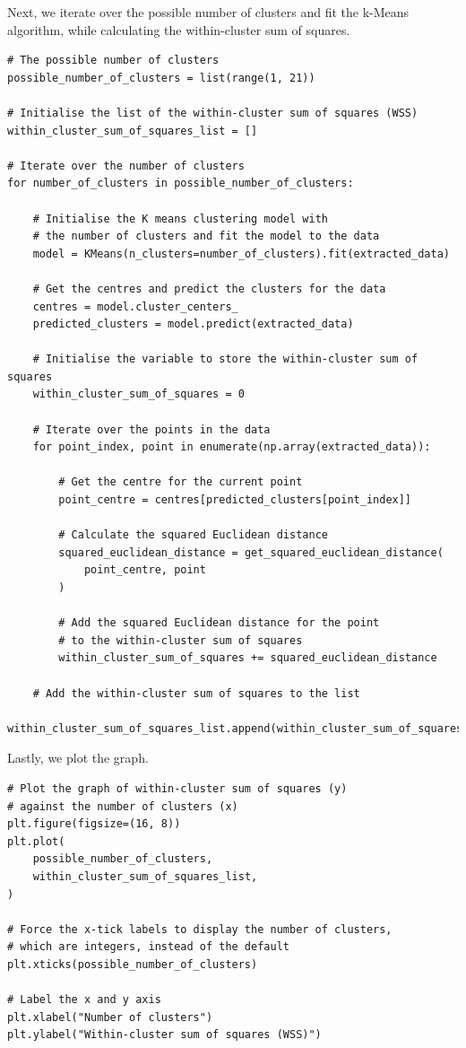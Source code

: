 \documentclass[11pt]{article}
\begin{document}
Next, we iterate over the possible number of clusters and fit the k-Means algorithm, while calculating the within-cluster sum of squares.
\begin{verbatim}
# The possible number of clusters
possible_number_of_clusters = list(range(1, 21))

# Initialise the list of the within-cluster sum of squares (WSS)
within_cluster_sum_of_squares_list = []

# Iterate over the number of clusters
for number_of_clusters in possible_number_of_clusters:

    # Initialise the K means clustering model with
    # the number of clusters and fit the model to the data
    model = KMeans(n_clusters=number_of_clusters).fit(extracted_data)

    # Get the centres and predict the clusters for the data
    centres = model.cluster_centers_
    predicted_clusters = model.predict(extracted_data)

    # Initialise the variable to store the within-cluster sum of squares
    within_cluster_sum_of_squares = 0

    # Iterate over the points in the data
    for point_index, point in enumerate(np.array(extracted_data)):

        # Get the centre for the current point
        point_centre = centres[predicted_clusters[point_index]]

        # Calculate the squared Euclidean distance
        squared_euclidean_distance = get_squared_euclidean_distance(
            point_centre, point
        )

        # Add the squared Euclidean distance for the point
        # to the within-cluster sum of squares
        within_cluster_sum_of_squares += squared_euclidean_distance

    # Add the within-cluster sum of squares to the list
    within_cluster_sum_of_squares_list.append(within_cluster_sum_of_squares)
\end{verbatim}

 \newpage

Lastly, we plot the graph.
\begin{verbatim}
# Plot the graph of within-cluster sum of squares (y)
# against the number of clusters (x)
plt.figure(figsize=(16, 8))
plt.plot(
    possible_number_of_clusters,
    within_cluster_sum_of_squares_list,
)

# Force the x-tick labels to display the number of clusters,
# which are integers, instead of the default
plt.xticks(possible_number_of_clusters)

# Label the x and y axis
plt.xlabel("Number of clusters")
plt.ylabel("Within-cluster sum of squares (WSS)")
\end{verbatim}
\end{document}
